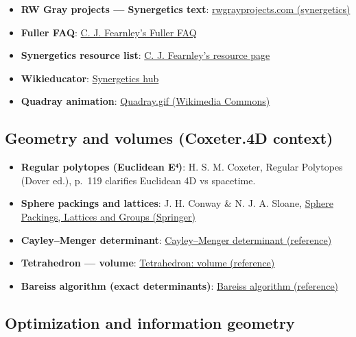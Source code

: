 \documentclass[
  10pt,
]{article}
\providecommand{\tightlist}{%
  \setlength{\itemsep}{0pt}\setlength{\parskip}{0pt}}
\begin{document}
\begin{itemize}
\tightlist
\item
  \textbf{RW Gray projects --- Synergetics text}:
  \href{http://www.rwgrayprojects.com/synergetics/s00/p0000.html}{rwgrayprojects.com
  (synergetics)}
\item
  \textbf{Fuller FAQ}:
  \href{https://www.cjfearnley.com/fuller-faq.pdf}{C. J. Fearnley's
  Fuller FAQ}
\item
  \textbf{Synergetics resource list}:
  \href{https://www.cjfearnley.com/fuller-faq-2.html}{C. J. Fearnley's
  resource page}
\item
  \textbf{Wikieducator}:
  \href{https://wikieducator.org/Synergetics}{Synergetics hub}
\item
  \textbf{Quadray animation}:
  \href{https://commons.wikimedia.org/wiki/File:Quadray.gif}{Quadray.gif
  (Wikimedia Commons)}
\end{itemize}

\hypertarget{geometry-and-volumes-coxeter.4d-context}{%
\subsection{Geometry and volumes (Coxeter.4D
context)}\label{geometry-and-volumes-coxeter.4d-context}}

\begin{itemize}
\tightlist
\item
  \textbf{Regular polytopes (Euclidean E⁴)}: H. S. M. Coxeter, Regular
  Polytopes (Dover ed.), p.~119 clarifies Euclidean 4D vs spacetime.
\item
  \textbf{Sphere packings and lattices}: J. H. Conway \& N. J. A.
  Sloane,
  \href{https://link.springer.com/book/10.1007/978-1-4757-6568-7}{Sphere
  Packings, Lattices and Groups (Springer)}
\item
  \textbf{Cayley--Menger determinant}:
  \href{https://en.wikipedia.org/wiki/Cayley\%E2\%80\%93Menger_determinant}{Cayley--Menger
  determinant (reference)}
\item
  \textbf{Tetrahedron --- volume}:
  \href{https://en.wikipedia.org/wiki/Tetrahedron\#Volume}{Tetrahedron:
  volume (reference)}
\item
  \textbf{Bareiss algorithm (exact determinants)}:
  \href{https://en.wikipedia.org/wiki/Bareiss_algorithm}{Bareiss
  algorithm (reference)}
\end{itemize}

\hypertarget{optimization-and-information-geometry}{%
\subsection{Optimization and information
geometry}\label{optimization-and-information-geometry}}
\end{document}
